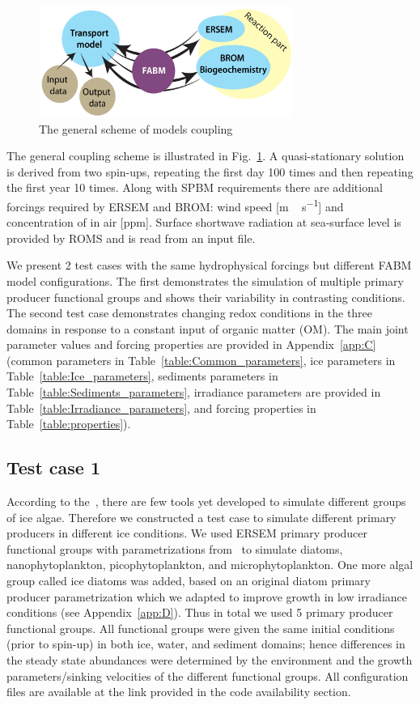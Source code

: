 \documentclass[gmd, manuscript]{copernicus}
\begin{document}
\begin{figure}[htbp]
\includegraphics[width=8.3cm]{fig02}
\caption{The general scheme of models coupling}
\label{fig:General_scheme}
\end{figure}

The general coupling scheme is illustrated in Fig.~\ref{fig:General_scheme}.
A quasi-stationary solution is derived from two spin-ups, repeating the first day 100 times and then repeating the first year 10 times.
Along with \textrm{SPBM} requirements there are additional forcings required by \textrm{ERSEM} and \textrm{BROM}: wind speed [\unit{m\,s^{-1}}] and concentration of  in air [\unit{ppm}].
Surface shortwave radiation at sea-surface level is provided by \textrm{ROMS} and is read from an input file.

We present 2 test cases with the same hydrophysical forcings but different \textrm{FABM} model configurations.
The first demonstrates the simulation of multiple primary producer functional groups and shows their variability in contrasting conditions.
The second test case demonstrates changing redox conditions in the three domains in response to a constant input of organic matter (\textrm{OM}).
The main joint parameter values and forcing properties are provided in Appendix~\ref{app:C} (common parameters in Table~\ref{table:Common_parameters}, ice parameters in Table~\ref{table:Ice_parameters}, sediments parameters in Table~\ref{table:Sediments_parameters}, irradiance parameters are provided in Table~\ref{table:Irradiance_parameters}, and forcing properties in Table~\ref{table:properties}).

\subsection{Test case 1}
\label{subsec:tc1}

According to the~\citet{Leeuwe2018}, there are few tools yet developed to simulate different groups of ice algae.
Therefore we constructed a test case to simulate different primary producers in different ice conditions.
We used \textrm{ERSEM} primary producer functional groups with parametrizations from~\citet{ersem2016} to simulate diatoms, nanophytoplankton, picophytoplankton, and microphytoplankton.
One more algal group called ice diatoms was added, based on an original diatom primary producer parametrization which we adapted to improve growth in low irradiance conditions (see Appendix~\ref{app:D}).
Thus in total we used 5 primary producer functional groups.
All functional groups were given the same initial conditions (prior to spin-up) in both ice, water, and sediment domains;
hence differences in the steady state abundances were determined by the environment and the growth parameters/sinking velocities of the different functional groups.
All configuration files are available at the link provided in the code availability section.
\end{document}

